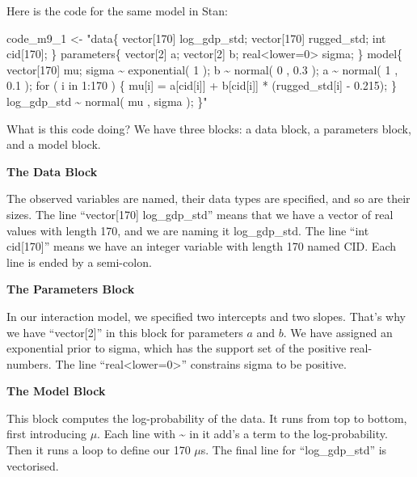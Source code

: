 \documentclass[
]{book}
\newenvironment{Shaded}{\begin{snugshade}}{\end{snugshade}}
\newcommand{\NormalTok}[1]{#1}
\newcommand{\OtherTok}[1]{\textcolor[rgb]{0.56,0.35,0.01}{#1}}
\newcommand{\StringTok}[1]{\textcolor[rgb]{0.31,0.60,0.02}{#1}}
\begin{document}
Here is the code for the same model in Stan:

\begin{Shaded}
\begin{Highlighting}[]
\NormalTok{code\_m9\_1 }\OtherTok{\textless{}{-}} 
\StringTok{"data\{}
\StringTok{    vector[170] log\_gdp\_std;}
\StringTok{    vector[170] rugged\_std;}
\StringTok{    int cid[170];}
\StringTok{\}}
\StringTok{parameters\{}
\StringTok{    vector[2] a;}
\StringTok{    vector[2] b;}
\StringTok{    real\textless{}lower=0\textgreater{} sigma;}
\StringTok{\}}
\StringTok{model\{}
\StringTok{    vector[170] mu;}
\StringTok{    sigma \textasciitilde{} exponential( 1 );}
\StringTok{    b \textasciitilde{} normal( 0 , 0.3 );}
\StringTok{    a \textasciitilde{} normal( 1 , 0.1 );}
\StringTok{    for ( i in 1:170 ) \{}
\StringTok{        mu[i] = a[cid[i]] + b[cid[i]] * (rugged\_std[i] {-} 0.215);}
\StringTok{    \}}
\StringTok{    log\_gdp\_std \textasciitilde{} normal( mu , sigma );}
\StringTok{\}"}
\end{Highlighting}
\end{Shaded}

What is this code doing? We have three blocks: a data block, a parameters block, and a model block.

\textbf{The Data Block}

The observed variables are named, their data types are specified, and so are their sizes. The line ``vector{[}170{]} log\_gdp\_std'' means that we have a vector of real values with length 170, and we are naming it log\_gdp\_std. The line ``int cid{[}170{]}'' means we have an integer variable with length 170 named CID. Each line is ended by a semi-colon.

\textbf{The Parameters Block}

In our interaction model, we specified two intercepts and two slopes. That's why we have ``vector{[}2{]}'' in this block for parameters \(a\) and \(b\). We have assigned an exponential prior to sigma, which has the support set of the positive real-numbers. The line ``real\textless lower=0\textgreater{}'' constrains sigma to be positive.

\textbf{The Model Block}

This block computes the log-probability of the data. It runs from top to bottom, first introducing \(\mu\). Each line with \textasciitilde{} in it add's a term to the log-probability. Then it runs a loop to define our 170 \(\mu\)s. The final line for ``log\_gdp\_std'' is vectorised.
\end{document}
